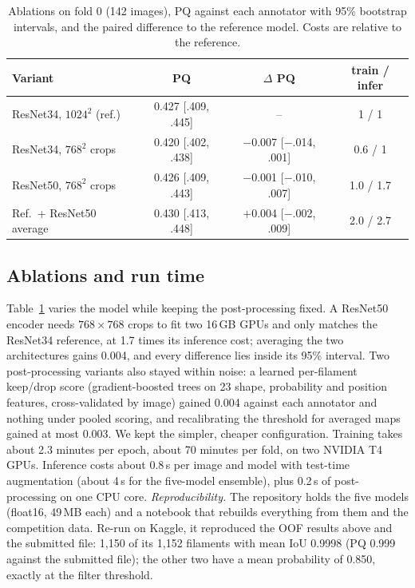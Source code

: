 \documentclass[sigconf]{acmart}
\begin{document}
\begin{table}[t]
  \caption{Ablations on fold 0 (142 images), PQ against each annotator with 95\% bootstrap intervals, and the paired difference to the reference model. Costs are relative to the reference.}
  \label{tab:abl}
  \small
  \setlength{\tabcolsep}{3.2pt}
  \begin{tabular}{@{}lccc@{}}
    \toprule
    Variant & PQ & $\Delta$ PQ & train / infer \\
    \midrule
    ResNet34, $1024^2$ (ref.) & 0.427 {\scriptsize[.409, .445]} & -- & 1 / 1 \\
    ResNet34, $768^2$ crops & 0.420 {\scriptsize[.402, .438]} & $-$0.007 {\scriptsize[$-$.014, .001]} & 0.6 / 1 \\
    ResNet50, $768^2$ crops & 0.426 {\scriptsize[.409, .443]} & $-$0.001 {\scriptsize[$-$.010, .007]} & 1.0 / 1.7 \\
    Ref.\ + ResNet50 average & 0.430 {\scriptsize[.413, .448]} & $+$0.004 {\scriptsize[$-$.002, .009]} & 2.0 / 2.7 \\
    \bottomrule
  \end{tabular}
\end{table}

\subsection{Ablations and run time}
Table~\ref{tab:abl} varies the model while keeping the post-processing fixed. A ResNet50 encoder needs $768\times768$ crops to fit two 16\,GB GPUs and only matches the ResNet34 reference, at 1.7 times its inference cost; averaging the two architectures gains 0.004, and every difference lies inside its 95\% interval. Two post-processing variants also stayed within noise: a learned per-filament keep/drop score (gradient-boosted trees on 23 shape, probability and position features, cross-validated by image) gained 0.004 against each annotator and nothing under pooled scoring, and recalibrating the threshold for averaged maps gained at most 0.003. We kept the simpler, cheaper configuration.
Training takes about 2.3 minutes per epoch, about 70 minutes per fold, on two NVIDIA T4 GPUs. Inference costs about 0.8\,s per image and model with test-time augmentation (about 4\,s for the five-model ensemble), plus 0.2\,s of post-processing on one CPU core.
\emph{Reproducibility.} The repository holds the five models (float16, 49\,MB each) and a notebook that rebuilds everything from them and the competition data. Re-run on Kaggle, it reproduced the OOF results above and the submitted file: 1{,}150 of its 1{,}152 filaments with mean IoU 0.9998 (PQ 0.999 against the submitted file); the other two have a mean probability of 0.850, exactly at the filter threshold.
\end{document}
